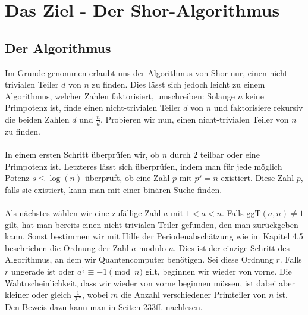 \section{Das Ziel - Der Shor-Algorithmus}
\subsection{Der Algorithmus}
Im Grunde genommen erlaubt uns der Algorithmus von Shor nur, einen nicht-trivialen Teiler $d$ von $n$ zu finden. Dies lässt sich jedoch leicht zu einem Algorithmus, welcher Zahlen faktorisiert, umschreiben: Solange $n$ keine Primpotenz ist, finde einen nicht-trivialen Teiler $d$ von $n$ und faktorisiere rekursiv die beiden Zahlen $d$ und $\frac{n}{d}$. Probieren wir nun, einen nicht-trivialen Teiler von $n$ zu finden.

\paragraph{}
In einem ersten Schritt überprüfen wir, ob $n$ durch $2$ teilbar oder eine Primpotenz ist. Letzteres lässt sich überprüfen, indem man für jede möglich Potenz $s \leq \log(n)$ überprüft, ob eine Zahl $p$ mit $p^s = n$ existiert. Diese Zahl $p$, falls sie existiert, kann man mit einer binären Suche finden.
\paragraph{}
Als nächstes wählen wir eine zufällige Zahl $a$ mit $1 < a < n$. Falls $\text{ggT}(a, n) \neq 1$ gilt, hat man bereits einen nicht-trivialen Teiler gefunden, den man zurückgeben kann. Sonst bestimmen wir mit Hilfe der Periodenabschätzung wie im Kapitel 4.5 beschrieben die Ordnung der Zahl $a$ modulo $n$. Dies ist der einzige Schritt des Algorithmus, an dem wir Quantencomputer benötigen. Sei diese Ordnung $r$. Falls $r$ ungerade ist oder $a^\frac{r}{2} \equiv -1 \pmod{n}$ gilt, beginnen wir wieder von vorne. Die Wahtrscheinlichkeit, dass wir wieder von vorne beginnen müssen, ist dabei aber kleiner oder gleich $\frac{1}{2^m}$,  wobei $m$ die Anzahl verschiedener Primteiler von $n$ ist. Den Beweis dazu kann man in \cite{QC} Seiten 233ff. nachlesen.
\paragraph{}

